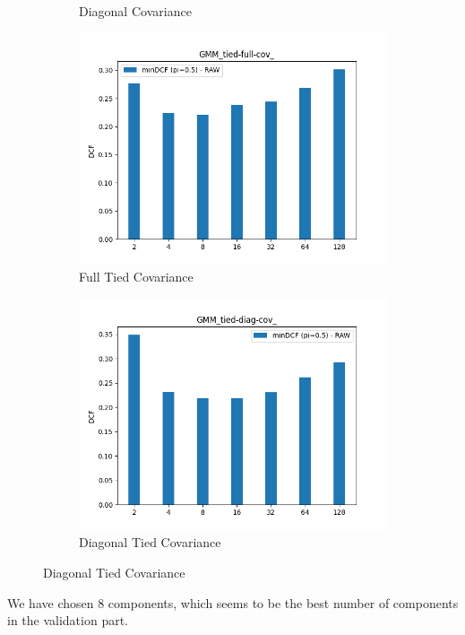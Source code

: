 \documentclass[english]{report}
\begin{document}
\begin{figure}[h!]
\begin{subfigure}{0.4\textwidth}
        \caption{Diagonal Covariance}
    \end{subfigure}
    \begin{subfigure}{0.4\textwidth}
        \includegraphics[scale=0.4]{../../images/evaluation/GMM_tied-full-cov_component_comparison}
        \caption{Full Tied Covariance}
    \end{subfigure}
    \begin{subfigure}{0.4\textwidth}
        \includegraphics[scale=0.4]{../../images/evaluation/GMM_tied-diag-cov_component_comparison}
        \caption{Diagonal Tied Covariance}
    \end{subfigure}
    \centering
    \label{fig:GMM_eval}
\end{figure}
We have chosen 8 components, which seems to be the best number of components in the validation part.
\newline
\end{document}
